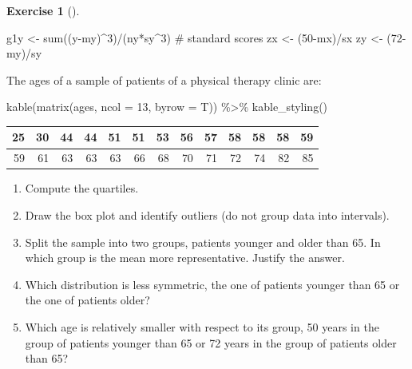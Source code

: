\documentclass[
  a4paper,
]{scrreport}
\newenvironment{Shaded}{\begin{snugshade}}{\end{snugshade}}
\newcommand{\AttributeTok}[1]{\textcolor[rgb]{0.40,0.45,0.13}{#1}}
\newcommand{\CommentTok}[1]{\textcolor[rgb]{0.37,0.37,0.37}{#1}}
\newcommand{\DecValTok}[1]{\textcolor[rgb]{0.68,0.00,0.00}{#1}}
\newcommand{\FunctionTok}[1]{\textcolor[rgb]{0.28,0.35,0.67}{#1}}
\newcommand{\NormalTok}[1]{\textcolor[rgb]{0.00,0.23,0.31}{#1}}
\newcommand{\OtherTok}[1]{\textcolor[rgb]{0.00,0.23,0.31}{#1}}
\newcommand{\SpecialCharTok}[1]{\textcolor[rgb]{0.37,0.37,0.37}{#1}}
\theoremstyle{definition}
\newtheorem{exercise}{Exercise}[chapter]
\theoremstyle{remark}
\begin{document}
\begin{exercise}[]
\begin{Shaded}
\begin{Highlighting}[]
\NormalTok{g1y }\OtherTok{\textless{}{-}} \FunctionTok{sum}\NormalTok{((y}\SpecialCharTok{{-}}\NormalTok{my)}\SpecialCharTok{\^{}}\DecValTok{3}\NormalTok{)}\SpecialCharTok{/}\NormalTok{(ny}\SpecialCharTok{*}\NormalTok{sy}\SpecialCharTok{\^{}}\DecValTok{3}\NormalTok{)}
\CommentTok{\# standard scores}
\NormalTok{zx }\OtherTok{\textless{}{-}}\NormalTok{ (}\DecValTok{50}\SpecialCharTok{{-}}\NormalTok{mx)}\SpecialCharTok{/}\NormalTok{sx}
\NormalTok{zy }\OtherTok{\textless{}{-}}\NormalTok{ (}\DecValTok{72}\SpecialCharTok{{-}}\NormalTok{my)}\SpecialCharTok{/}\NormalTok{sy}
\end{Highlighting}
\end{Shaded}

The ages of a sample of patients of a physical therapy clinic are:

\begin{Shaded}
\begin{Highlighting}[]
\FunctionTok{kable}\NormalTok{(}\FunctionTok{matrix}\NormalTok{(ages, }\AttributeTok{ncol =} \DecValTok{13}\NormalTok{, }\AttributeTok{byrow =}\NormalTok{ T)) }\SpecialCharTok{\%\textgreater{}\%} \FunctionTok{kable\_styling}\NormalTok{()}
\end{Highlighting}
\end{Shaded}

\begin{table}
\centering
\begin{tabular}{r|r|r|r|r|r|r|r|r|r|r|r|r}
\hline
25 & 30 & 44 & 44 & 51 & 51 & 53 & 56 & 57 & 58 & 58 & 58 & 59\\
\hline
59 & 61 & 63 & 63 & 63 & 66 & 68 & 70 & 71 & 72 & 74 & 82 & 85\\
\hline
\end{tabular}
\end{table}

\begin{enumerate}
\def\labelenumi{\alph{enumi}.}
\item
  Compute the quartiles.
\item
  Draw the box plot and identify outliers (do not group data into
  intervals).
\item
  Split the sample into two groups, patients younger and older than 65.
  In which group is the mean more representative. Justify the answer.
\item
  Which distribution is less symmetric, the one of patients younger than
  65 or the one of patients older?
\item
  Which age is relatively smaller with respect to its group, 50 years in
  the group of patients younger than 65 or 72 years in the group of
  patients older than 65?
\end{enumerate}


\end{exercise}
\end{document}
